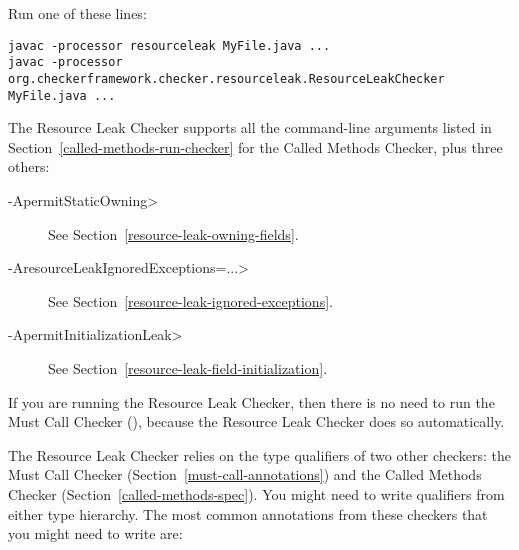 
Run one of these lines:

\begin{Verbatim}
javac -processor resourceleak MyFile.java ...
javac -processor org.checkerframework.checker.resourceleak.ResourceLeakChecker MyFile.java ...
\end{Verbatim}

The Resource Leak Checker supports all the command-line arguments
listed in Section~\ref{called-methods-run-checker} for
the Called Methods Checker, plus three others:

\begin{description}
\item[\<-ApermitStaticOwning>]
  See Section~\ref{resource-leak-owning-fields}.
\item[\<-AresourceLeakIgnoredExceptions=...>]
  See Section~\ref{resource-leak-ignored-exceptions}.
\item[\<-ApermitInitializationLeak>]
  See Section~\ref{resource-leak-field-initialization}.
\end{description}

If you are running the Resource Leak Checker, then there is no need to run
the Must Call Checker (), because the
Resource Leak Checker does so automatically.



The Resource Leak Checker relies on the type qualifiers of two other checkers:
the Must Call Checker (Section~\ref{must-call-annotations}) and
the Called Methods Checker (Section~\ref{called-methods-spec}). You might need
to write qualifiers from either type hierarchy. The most common annotations from
these checkers that you might need to write are:

